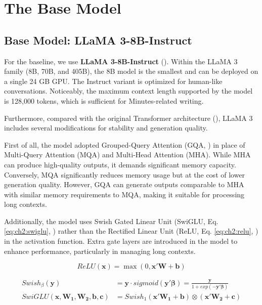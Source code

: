 



\section{The Base Model}\label{ch2:sec:base_model}



\subsection*{Base Model: LLaMA 3-8B-Instruct}
For the baseline, we use \textbf{LLaMA 3-8B-Instruct} (\cite{meta2024llama3}). Within the LLaMA 3 family (8B, 70B, and 405B), the 8B model is the smallest and can be deployed on a single 24 GB GPU. The Instruct variant is optimized for human-like conversations. Noticeably, the maximum context length supported by the model is 128,000 tokens, which is sufficient for Minutes-related writing.


Furthermore, compared with the original Transformer architecture (\cite{vaswani-etal2018}), LLaMA 3 includes several modifications for stability and generation quality.

First of all, the model adopted Grouped-Query Attention (GQA, \cite{ainslie2023gqa}) in place of Multi-Query Attention (MQA) and Multi-Head Attention (MHA). While MHA can produce high-quality outputs, it demands significant memory capacity. Conversely, MQA significantly reduces memory usage but at the cost of lower generation quality. However, GQA can generate outputs comparable to MHA with similar memory requirements to MQA, making it suitable for processing long contexts.

Additionally, the model uses Swish Gated Linear Unit (SwiGLU, Eq. \eqref{eq:ch2:swiglu}, \cite{shazeer2020glu}) rather than the Rectified Linear Unit (ReLU, Eq. \eqref{eq:ch2:relu}, \cite{glorot2011deep}) in the activation function. Extra gate layers are introduced in the model to enhance performance, particularly in managing long contexts.



\begin{equation}\label{eq:ch2:relu}
    ReLU (\mathbf {x} )=\max(0,\mathbf {x} '\mathbf{W} + \mathbf{b})
\end{equation}


\begin{equation}\label{eq:ch2:swiglu}
    \begin{split}
        Swish_{\beta}(\mathbf{y}) &= \mathbf{y} \cdot sigmoid(\mathbf{y}' \mathbf{\beta}) = \frac{\mathbf{y}}{1 + exp(-\mathbf{y}' \mathbf{\beta})} \\
        SwiGLU(\mathbf{x}, \mathbf{W_1}, \mathbf{W_2}, \mathbf{b}, \mathbf{c}) &= Swish_{1}(\mathbf{x}' \mathbf{W_1} + \mathbf{b}) \otimes (\mathbf{x}' \mathbf{W_2} + \mathbf{c})
    \end{split}
\end{equation}


